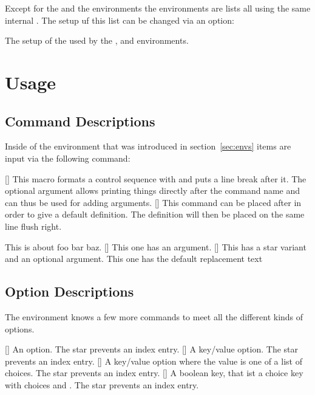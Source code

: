 \documentclass[load-preamble]{cnltx-doc}
\begin{document}
Except for the  and the  environments the
environments are lists all using the same internal .  The setup uf
this list can be changed via an option:

\begin{options}
    The setup of the  used by the ,  and
     environments.
\end{options}

\section{Usage}
\subsection{Command Descriptions}\label{sec:usage:commands}
Inside of the environment  that was introduced in
section~\ref{sec:envs} items are input via the following command:
\begin{commands}
  [\sarg{}]
    This macro formats a control sequence with  and puts a line break
    after it.  The optional argument allows printing things directly after the
    command name and can thus be used for adding arguments.
  []
    This command can be placed after  in order to give a default
    definition.  The definition will then be placed on the same line flush
    right.
\end{commands}
\begin{example}
  \begin{commands}
      This is about foo bar baz.
    []
      This one has an argument.
    [\sarg{}]
      This has a star variant and an optional argument.
      This one has the default replacement text 
  \end{commands}
\end{example}

\subsection{Option Descriptions}\label{sec:usage:options}

The  environment knows a few more commands to meet all the
different kinds of options.
\begin{commands}
  [\sarg]
    An option.  The star prevents an index entry.
  [\sarg{}]
    A key/value option.  The star prevents an index entry.
  [\sarg{}]
    A key/value option where the value is one of a list of choices.  The star
    prevents an index entry.
  [\sarg{}]
    A boolean key, that ist a choice key with choices  and 
    .  The star prevents an index entry.
\end{commands}
\end{document}
